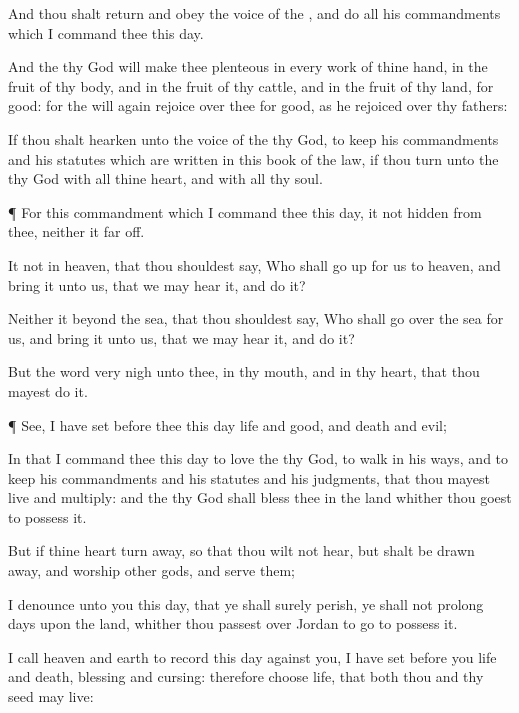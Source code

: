 {And thou shalt
return and
obey the
voice of the
{}, and
do all his
commandments which I
command thee this
day.

And the
{} thy
God will make thee
plenteous in every
work of thine
hand, in the
fruit of thy
body, and in the
fruit of thy
cattle, and in the
fruit of thy
land, for
good: for the
{} will
again
rejoice over thee for
good, as he
rejoiced over thy
fathers:

If thou shalt
hearken unto the
voice of the
{} thy
God, to
keep his
commandments and his
statutes which are
written in this
book of the
law,
{} if thou
turn unto the
{} thy
God with all thine
heart, and with all thy
soul.


\par }{\PP {}¶ For this
commandment which I
command thee this
day, it
{} not
hidden from thee, neither
{} it far
off.

It
{} not in
heaven, that thou shouldest
say, Who shall go
up for us to
heaven, and
bring it unto us, that we may
hear it, and
do it?

Neither
{} it
beyond the
sea, that thou shouldest
say, Who shall
go
over the
sea for us, and
bring it unto us, that we may
hear it, and
do it?

But the
word
{}
very
nigh unto thee, in thy
mouth, and in thy
heart, that thou mayest
do it.


\par }{\PP {}¶
See, I have
set
before thee this
day
life and
good, and
death and
evil;

In that I
command thee this
day to
love the
{} thy
God, to
walk in his
ways, and to
keep his
commandments and his
statutes and his
judgments, that thou mayest
live and
multiply: and the
{} thy
God shall
bless thee in the
land whither thou
goest to
possess it.

But if thine
heart turn
away, so that thou wilt not
hear, but shalt be drawn
away, and
worship
other
gods, and
serve them;

I
denounce unto you this
day, that ye shall
surely
perish,
{} ye shall not
prolong
{}
days upon the
land, whither thou passest
over
Jordan to
go to
possess it.

I
call
heaven and
earth to
record this
day against you,
{} I have
set
before you
life and
death,
blessing and
cursing: therefore
choose
life, that both thou and thy
seed may
live:

}
